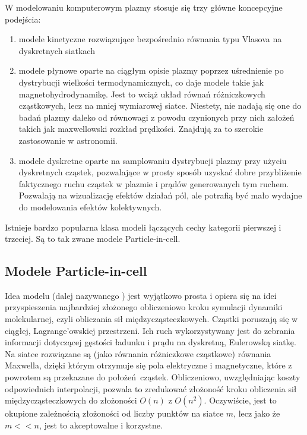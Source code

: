     W modelowaniu komputerowym plazmy stosuje się trzy główne koncepcyjne podejścia:
    \begin{enumerate}
        \item modele kinetyczne rozwiązujące bezpośrednio równania typu Vlasova
            na dyskretnych siatkach
        \item modele płynowe oparte na ciągłym opisie plazmy poprzez
            uśrednienie po dystrybucji wielkości termodynamicznych, co daje
            modele takie jak magnetohydrodynamikę. Jest to wciąż układ równań
            różniczkowych cząstkowych, lecz na mniej wymiarowej siatce.
            Niestety, nie nadają się one do badań plazmy daleko od równowagi z
            powodu czynionych przy nich założeń takich jak maxwellowski rozkład
            prędkości. Znajdują za to szerokie zastosowanie w astronomii.
        \item modele dyskretne oparte na samplowaniu dystrybucji plazmy przy
            użyciu dyskretnych cząstek, pozwalające w prosty sposób uzyskać
            dobre przybliżenie faktycznego ruchu cząstek w plazmie i prądów
            generowanych tym ruchem. Pozwalają na wizualizację efektów działań
            pól, ale potrafią być mało wydajne do modelowania efektów kolektywnych.
    \end{enumerate}

    Istnieje bardzo popularna klasa modeli łączących cechy kategorii pierwszej i trzeciej.
    Są to tak zwane modele Particle-in-cell.

    \subsection{Modele Particle-in-cell}

    Idea modelu  (dalej nazywanego ) jest wyjątkowo
    prosta i opiera się na idei przyspieszenia najbardziej złożonego obliczeniowo
    kroku symulacji dynamiki molekularnej, czyli obliczania sił
    międzycząsteczkowych.  Cząstki poruszają się w ciągłej, Lagrange'owskiej
    przestrzeni.  Ich ruch wykorzystywany jest do zebrania informacji dotyczącej
    gęstości ładunku i prądu na dyskretną, Eulerowską siatkę. Na siatce rozwiązane
    są (jako równania różniczkowe cząstkowe) równania Maxwella, dzięki którym
    otrzymuje się pola elektryczne i magnetyczne, które z powrotem są przekazane do
    położeń cząstek.  Obliczeniowo, uwzględniając koszty odpowiednich interpolacji,
    pozwala to zredukować złożoność kroku obliczenia sił międzycząsteczkowych do złożoności $O(n)$ z $O(n^2)$.
    Oczywiście, jest to okupione zależnością złożoności od liczby punktów na siatce $m$, lecz jako że $m << n$,
    jest to akceptowalne i korzystne.

